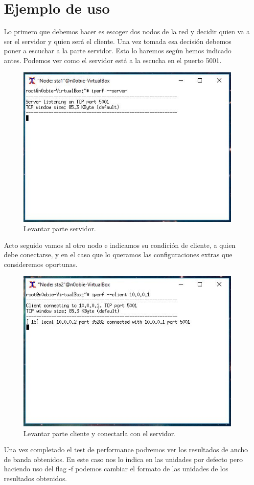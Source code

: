 \section{Ejemplo de uso}
Lo primero que debemos hacer es escoger dos nodos de la red y decidir quien va a ser el servidor y quien será el cliente. Una vez tomada esa decisión debemos poner a escuchar a la parte servidor. Esto lo haremos según hemos indicado antes. Podemos ver como el servidor está a la escucha en el puerto 5001.
\begin{figure}[!htb]
  \centering
    \includegraphics[width=0.5\linewidth]{./img/anexos/2.JPG}
    \caption{Levantar parte servidor.}
  \label{fig:yo}
\end{figure}
\newpage
Acto seguido vamos al otro nodo e indicamos su condición de cliente, a quien debe conectarse, y en el caso que lo queramos las configuraciones extras que consideremos oportunas.\newline
\newline
\begin{figure}[!htb]
  \centering
    \includegraphics[width=0.7\linewidth]{./img/anexos/3.JPG}
    \caption{Levantar parte cliente y conectarla con el servidor.}
  \label{fig:yo}
\end{figure}
\newline
Una vez completado el test de performance podremos ver los resultados de ancho de banda obtenidos. En este caso nos lo indica en las unidades por defecto pero haciendo uso del flag -f podemos cambiar el formato de las unidades de los resultados obtenidos.\newline
\newline

